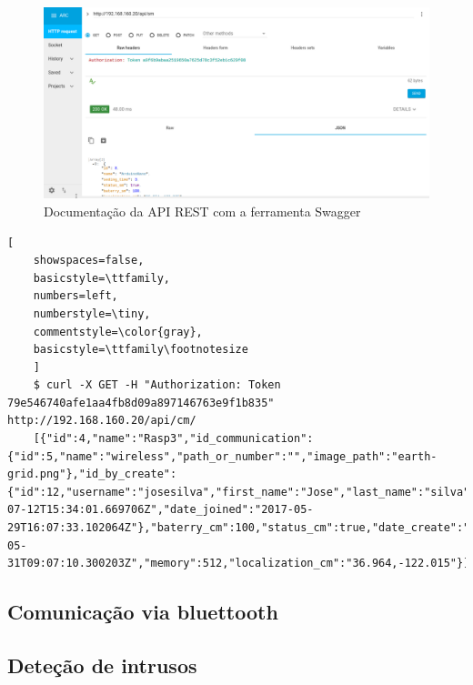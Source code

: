 \begin{figure}[h]
	\centering
	\includegraphics[width=\linewidth]{prints-web/API_teste1.png}
	\caption{Documentação da API REST com a ferramenta Swagger}
	\label{docapi}
\end{figure}







	\begin{lstlisting}[
	showspaces=false,
	basicstyle=\ttfamily,
	numbers=left,
	numberstyle=\tiny,
	commentstyle=\color{gray},
	basicstyle=\ttfamily\footnotesize
	]
	$ curl -X GET -H "Authorization: Token  79e546740afe1aa4fb8d09a897146763e9f1b835" http://192.168.160.20/api/cm/
	[{"id":4,"name":"Rasp3","id_communication":{"id":5,"name":"wireless","path_or_number":"","image_path":"earth-grid.png"},"id_by_create":{"id":12,"username":"josesilva","first_name":"Jose","last_name":"silva","email":"ruipedrooliveira@ua.pt","last_login":"2017-07-12T15:34:01.669706Z","date_joined":"2017-05-29T16:07:33.102064Z"},"baterry_cm":100,"status_cm":true,"date_create":"2017-05-31T09:07:10.300203Z","memory":512,"localization_cm":"36.964,-122.015"}]
	\end{lstlisting}
	
	
	
\subsection{Comunicação via bluettooth }



\subsection{Deteção de intrusos}








